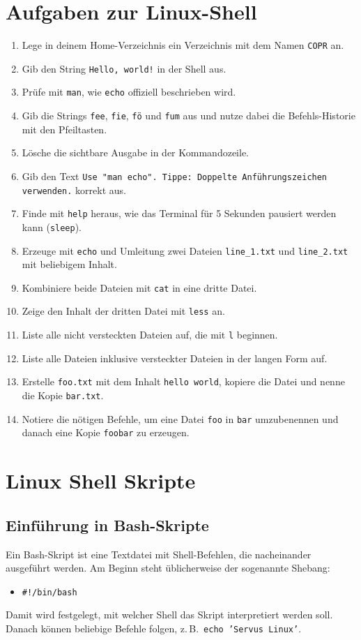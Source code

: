 \documentclass[11pt, oneside, numbers=nönddot]{scrbook}
\begin{document}
\chapter{Aufgaben zur Linux-Shell}
\begin{enumerate}
\item Lege in deinem Home-Verzeichnis ein Verzeichnis mit dem Namen \texttt{COPR} an.
\item Gib den String \texttt{Hello, world!} in der Shell aus.
\item Prüfe mit \texttt{man}, wie \texttt{echo} offiziell beschrieben wird.
\item Gib die Strings \texttt{fee}, \texttt{fie}, \texttt{fö} und \texttt{fum} aus und nutze dabei die Befehls-Historie mit den Pfeiltasten.
\item Lösche die sichtbare Ausgabe in der Kommandozeile.
\item Gib den Text \texttt{Use "man echo". Tippe: Doppelte Anführungszeichen verwenden.} korrekt aus.
\item Finde mit \texttt{help} heraus, wie das Terminal für 5 Sekunden pausiert werden kann (\texttt{sleep}).
\item Erzeuge mit \texttt{echo} und Umleitung zwei Dateien \texttt{line\_1.txt} und \texttt{line\_2.txt} mit beliebigem Inhalt.
\item Kombiniere beide Dateien mit \texttt{cat} in eine dritte Datei.
\item Zeige den Inhalt der dritten Datei mit \texttt{less} an.
\item Liste alle nicht versteckten Dateien auf, die mit \texttt{l} beginnen.
\item Liste alle Dateien inklusive versteckter Dateien in der langen Form auf.
\item Erstelle \texttt{foo.txt} mit dem Inhalt \texttt{hello world}, kopiere die Datei und nenne die Kopie \texttt{bar.txt}.
\item Notiere die nötigen Befehle, um eine Datei \texttt{foo} in \texttt{bar} umzubenennen und danach eine Kopie \texttt{foobar} zu erzeugen.
\end{enumerate}

\chapter{Linux Shell Skripte}
\section{Einführung in Bash-Skripte}
Ein Bash-Skript ist eine Textdatei mit Shell-Befehlen, die nacheinander ausgeführt werden. Am Beginn steht üblicherweise der sogenannte Shebang:
\begin{itemize}
\item \texttt{\#!/bin/bash}
\end{itemize}
Damit wird festgelegt, mit welcher Shell das Skript interpretiert werden soll. Danach können beliebige Befehle folgen, z.\,B.\ \texttt{echo 'Servus Linux'}.
\end{document}

